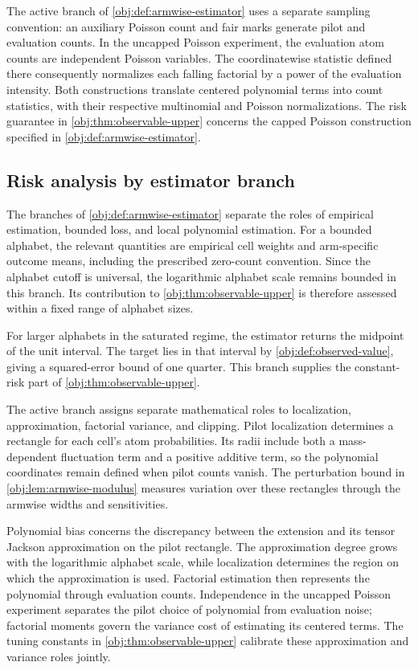 The active branch of \cref{obj:def:armwise-estimator} uses a separate sampling convention: an auxiliary Poisson count and fair marks generate pilot and evaluation counts. In the uncapped Poisson experiment, the evaluation atom counts are independent Poisson variables. The coordinatewise statistic defined there consequently normalizes each falling factorial by a power of the evaluation intensity. Both constructions translate centered polynomial terms into count statistics, with their respective multinomial and Poisson normalizations. The risk guarantee in \cref{obj:thm:observable-upper} concerns the capped Poisson construction specified in \cref{obj:def:armwise-estimator}.

\subsection{Risk analysis by estimator branch}

The branches of \cref{obj:def:armwise-estimator} separate the roles of empirical estimation, bounded loss, and local polynomial estimation. For a bounded alphabet, the relevant quantities are empirical cell weights and arm-specific outcome means, including the prescribed zero-count convention. Since the alphabet cutoff is universal, the logarithmic alphabet scale remains bounded in this branch. Its contribution to \cref{obj:thm:observable-upper} is therefore assessed within a fixed range of alphabet sizes.

For larger alphabets in the saturated regime, the estimator returns the midpoint of the unit interval. The target lies in that interval by \cref{obj:def:observed-value}, giving a squared-error bound of one quarter. This branch supplies the constant-risk part of \cref{obj:thm:observable-upper}.

The active branch assigns separate mathematical roles to localization, approximation, factorial variance, and clipping. Pilot localization determines a rectangle for each cell's atom probabilities. Its radii include both a mass-dependent fluctuation term and a positive additive term, so the polynomial coordinates remain defined when pilot counts vanish. The perturbation bound in \cref{obj:lem:armwise-modulus} measures variation over these rectangles through the armwise widths and sensitivities.

Polynomial bias concerns the discrepancy between the extension and its tensor Jackson approximation on the pilot rectangle. The approximation degree grows with the logarithmic alphabet scale, while localization determines the region on which the approximation is used. Factorial estimation then represents the polynomial through evaluation counts. Independence in the uncapped Poisson experiment separates the pilot choice of polynomial from evaluation noise; factorial moments govern the variance cost of estimating its centered terms. The tuning constants in \cref{obj:thm:observable-upper} calibrate these approximation and variance roles jointly.

